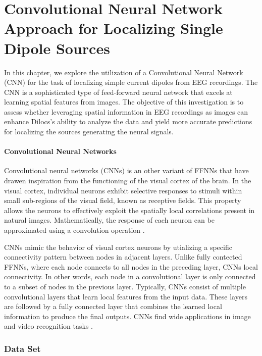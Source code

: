 \documentclass[a4paper, UKenglish, 11pt]{uiomaster}
\begin{document}
\chapter{Convolutional Neural Network Approach for Localizing Single Dipole Sources}
In this chapter, we explore the utilization of a Convolutional Neural Network (CNN) for the task of localizing simple current dipoles from EEG recordings. The CNN is a sophisticated type of feed-forward neural network that excels at learning spatial features from images. The objective of this investigation is to assess whether leveraging spatial information in EEG recordings as images can enhance Dilocs's ability to analyze the data and yield more accurate predictions for localizing the sources generating the neural signals.

\subsubsection{Convolutional Neural Networks}
Convolutional neural networks (CNNs) is an other variant of FFNNs that have drawen inspiration from the functioning of the visual cortex of the brain. In the visual cortex, individual neurons exhibit selective responses to stimuli within small sub-regions of the visual field, known as receptive fields. This property allows the neurons to effectively exploit the spatially local correlations present in natural images. Mathematically, the response of each neuron can be approximated using a convolution operation \cite{Hjorth-Jensen2022}.

CNNs mimic the behavior of visual cortex neurons by utializing a specific connectivity pattern between nodes in adjacent layers. Unlike fully contected FFNNs, where each node connects to all nodes in the preceding layer, CNNs  local connectivity. In other words, each node in a convolutional layer is only connected to a subset of nodes in the previous layer. Typically, CNNs consist of multiple convolutional layers that learn local features from the input data. These layers are followed by a fully connected layer that combines the learned local information to produce the final outputs. CNNs find wide applications in image and video recognition tasks \cite{Hjorth-Jensen2022}.



\subsection{Data Set}
\end{document}
